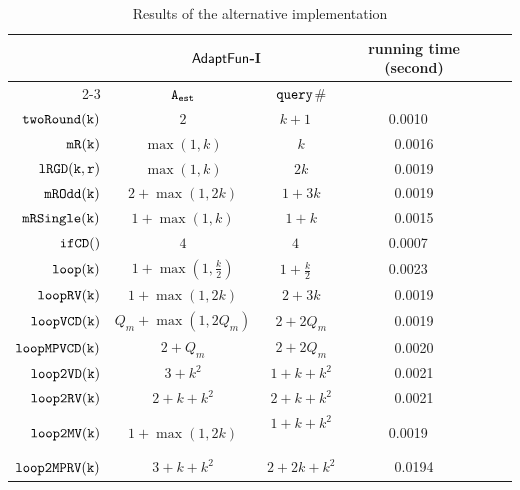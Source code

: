 {
\begin {table}[H]
    \caption{Results of the alternative {\THESYSTEM} implementation}
        \label{tb:adapt-imp-alternatives}
        \begin{center}
        \centering
{\scriptsize
        \begin{tabular}{ | >{\tiny}r | c | c | c | c | c  |}
        \hline \hline
        \multirow{2}{*}{Program $c$}
         & \multicolumn{2}{c|}{$\textsf{AdaptFun}$-I}
         & \multirow{2}{*}{running time (second)} \\ 
         \cline{2-3}
         & {${\mathtt{A_{est}}}$ } & {${\tt query}$\# } & \\ 
         \hline \hline
         $  \mathtt{twoRound(k)}$ &  $2$    & $k+1 $  ~ & 0.0010 ~  \\
         $  \mathtt{mR(k)}$ &   $\max(1,k)$ & $k$  &  ~ 0.0016 ~ \\
         $  \mathtt{lRGD(k, r)}$ & $\max(1,k) $ & $ 2k $  &  ~ 0.0019 ~  \\
         $  \mathtt{mROdd(k)}$  &  $2+\max(1,2k)  $ & $1 + 3 k  $  &  ~ 0.0019 ~\\
         $  \mathtt{mRSingle(k)}$    & $1+ \max(1, k) $ & $1 + k$  &  ~ 0.0015 ~ \\
         $  \mathtt{ifCD()}$   & $4$ &   $4$  ~ & 0.0007 ~ \\
         $  \mathtt{loop(k)}$ &    $1 + \max(1, \frac{k}{2}) $  &  $1+\frac{k}{2} $ ~ & 0.0023 ~ \\
         $  \mathtt{loopRV(k)}$   &  $ 1 + \max(1,2k)$ & $2 + 3 k$  &  ~ 0.0019 ~ \\
         $  {\mathtt{loopVCD(k)}} $  &  ${Q_m+\max(1,2Q_m)}$  & $2+2Q_m$   &  ~ 0.0019 ~ \\
         $ {\mathtt{loopMPVCD(k)}}$  &  $2 + Q_m$  & $2+2Q_m$   &   ~ 0.0020 ~ \\
         $  \mathtt{loop2VD(k)}$  &   $3 + k^2$ & $1 + k + k^2$   &  ~ 0.0021 ~ \\
         $  \mathtt{loop2RV(k)}$  &  $ 2 + k +  k^2 $    &  $2 + k + k^2$   &  ~ 0.0021 ~ \\
         $  \mathtt{loop2MV(k)}$  & $1 + \max(1,2k) $ &  $1 + k + k^2 $  ~ & 0.0019 ~ \\
         $ \mathtt{loop2MPRV(k)}$  &  $3 + k + k^2  $ &  $2 + 2k + k^2  $  &  ~ 0.0194 ~ \\

\end{tabular}}
\end{center}
\end{table}}
